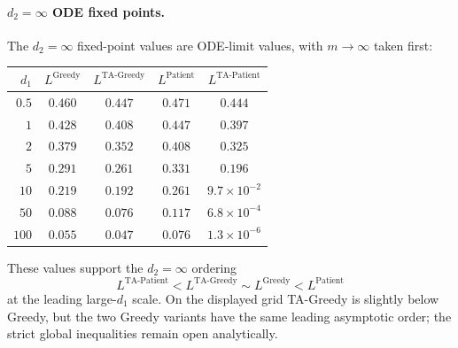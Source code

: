 \documentclass{article}
\theoremstyle{plain}
\theoremstyle{definition}
\begin{document}
\paragraph{$d_2=\infty$ ODE fixed points.}
The $d_2=\infty$ fixed-point values are ODE-limit values, with $m\to\infty$ taken first:
\begin{center}
\begin{tabular}{r|cccc}
$d_1$ & $L^{\text{Greedy}}$ & $L^{\text{TA-Greedy}}$ & $L^{\text{Patient}}$ & $L^{\text{TA-Patient}}$\\\hline
$0.5$ & $0.460$ & $0.447$ & $0.471$ & $0.444$\\
$1$   & $0.428$ & $0.408$ & $0.447$ & $0.397$\\
$2$   & $0.379$ & $0.352$ & $0.408$ & $0.325$\\
$5$   & $0.291$ & $0.261$ & $0.331$ & $0.196$\\
$10$  & $0.219$ & $0.192$ & $0.261$ & $9.7\!\times\!10^{-2}$\\
$50$  & $0.088$ & $0.076$ & $0.117$ & $6.8\!\times\!10^{-4}$\\
$100$ & $0.055$ & $0.047$ & $0.076$ & $1.3\!\times\!10^{-6}$
\end{tabular}
\end{center}
These values support the $d_2=\infty$ ordering
\[
L^{\text{TA-Patient}}<L^{\text{TA-Greedy}}\sim L^{\text{Greedy}}<L^{\text{Patient}}
\]
at the leading large-$d_1$ scale. On the displayed grid TA-Greedy is slightly below Greedy, but the two Greedy variants have the same leading asymptotic order; the strict global inequalities remain open analytically.
\end{document}
